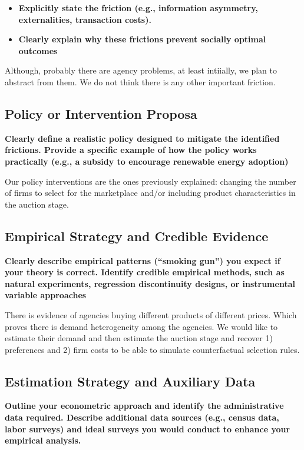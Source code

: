 \documentclass[12pt]{article}
\theoremstyle{plain}
\theoremstyle{plain}
\begin{document}
\begin{itemize}
    \item \textbf{Explicitly state the friction (e.g., information asymmetry, externalities, transaction costs).}

    \item \textbf{Clearly explain why these frictions prevent socially optimal outcomes}
\end{itemize}

Although, probably there are agency problems, at least intiially, we plan to abstract from them. We do not think there is any other important friction. 

\subsection{ Policy or Intervention Proposa}

\textbf{Clearly define a realistic policy designed to mitigate the identified frictions. Provide a specific example of how the policy works practically (e.g., a subsidy
 to encourage renewable energy adoption)}

 
Our policy interventions are the ones previously explained: changing the number of firms to select for the marketplace and/or including product characteristics in the auction stage. 

\subsection{ Empirical Strategy and Credible Evidence}

\textbf{Clearly describe empirical patterns (“smoking gun”) you expect if your theory is correct. Identify credible empirical methods, such as natural experiments, regression discontinuity designs, or instrumental variable approaches}

There is evidence of agencies buying different products of different prices. Which proves there is demand heterogeneity among the agencies. We would like to estimate their demand and then estimate the auction stage and recover 1) preferences and 2) firm  costs to be able to simulate counterfactual selection rules.  

\subsection{ Estimation Strategy and Auxiliary Data}

\textbf{Outline your econometric approach and identify the administrative data required. Describe additional data sources (e.g., census data, labor surveys) and ideal surveys you would conduct to enhance your empirical analysis.}
\end{document}
